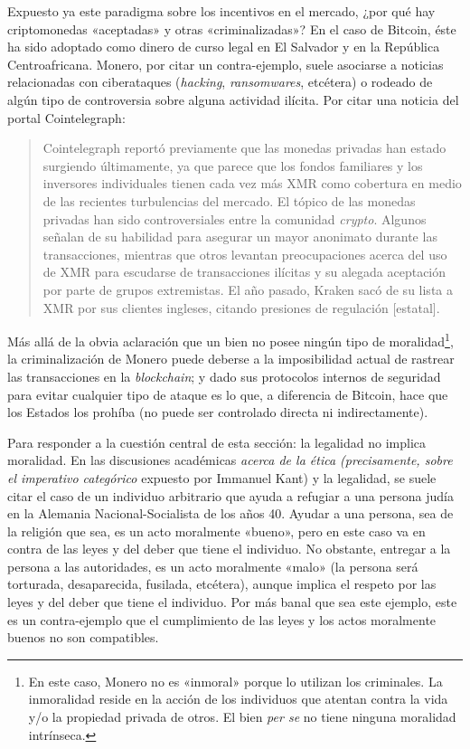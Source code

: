 \documentclass[12pt,a4paper]{article}
\begin{document}
Expuesto ya este paradigma sobre los incentivos en el mercado, ¿por qué hay criptomonedas «aceptadas» y otras «criminalizadas»? En el caso de Bitcoin, éste ha sido adoptado como dinero de curso legal en El Salvador y en la República Centroafricana. Monero, por citar un contra-ejemplo, suele asociarse a noticias relacionadas con ciberataques (\textit{hacking}, \textit{ransomwares}, etcétera) o rodeado de algún tipo de controversia sobre alguna actividad ilícita. Por citar una noticia del portal Cointelegraph:

\begin{quotation}
Cointelegraph reportó previamente que las monedas privadas han estado surgiendo últimamente, ya que parece que los fondos familiares y los inversores individuales tienen cada vez más XMR como cobertura en medio de las recientes turbulencias del mercado. El tópico de las monedas privadas han sido controversiales entre la comunidad \textit{crypto}. Algunos señalan de su habilidad para asegurar un mayor anonimato durante las transacciones, mientras que otros levantan preocupaciones acerca del uso de XMR para escudarse de transacciones ilícitas y su alegada aceptación por parte de grupos extremistas. El año pasado, Kraken sacó de su lista a XMR por sus clientes ingleses, citando presiones de regulación [estatal]. \cite{cointelegraph}
\end{quotation}

Más allá de la obvia aclaración que un bien no posee ningún tipo de moralidad\footnote{En este caso, Monero no es «inmoral» porque lo utilizan los criminales. La inmoralidad reside en la acción de los individuos que atentan contra la vida y/o la propiedad privada de otros. El bien \textit{per se} no tiene ninguna moralidad intrínseca.}, la criminalización de Monero puede deberse a la imposibilidad actual de rastrear las transacciones en la \textit{blockchain}; y dado sus protocolos internos de seguridad para evitar cualquier tipo de ataque es lo que, a diferencia de Bitcoin, hace que los Estados los prohíba (no puede ser controlado directa ni indirectamente).

Para responder a la cuestión central de esta sección: la legalidad no implica moralidad. En las discusiones académicas \textit{acerca de la ética (precisamente, sobre el imperativo categórico} expuesto por Immanuel Kant) y la legalidad, se suele citar el caso de un individuo arbitrario que ayuda a refugiar a una persona judía en la Alemania Nacional-Socialista de los años 40. Ayudar a una persona, sea de la religión que sea, es un acto moralmente «bueno», pero en este caso va en contra de las leyes y del deber que tiene el individuo. No obstante, entregar a la persona a las autoridades, es un acto moralmente «malo» (la persona será torturada, desaparecida, fusilada, etcétera), aunque implica el respeto por las leyes y del deber que tiene el individuo. Por más banal que sea este ejemplo, este es un contra-ejemplo que el cumplimiento de las leyes y los actos moralmente buenos no son compatibles.
\end{document}
